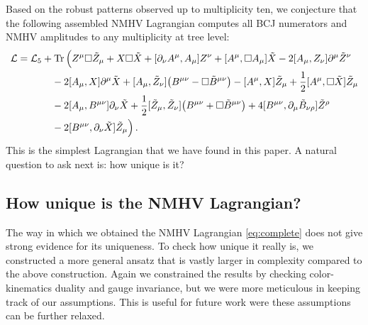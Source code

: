 \documentclass[11pt,a4paper]{article}
\newcommand{\scalarF}{\textcolor{black}{X}}
\begin{document}
 Based on the robust patterns observed up to multiplicity ten, we conjecture that the following assembled NMHV Lagrangian computes all BCJ numerators and NMHV amplitudes to any multiplicity at tree level:
\begin{align}\label{eq:complete}
\mathcal{L} = \mathcal{L}_5 &+ \text{Tr} \, \Big( Z^\mu \Box \tilde{Z}_\mu + X \Box \tilde{X}+ 
  [\partial_\nu A^\mu, A_\mu]  Z^\nu +  [A^\mu, \Box  A_\mu] \tilde{X} -2  [A_\mu, Z_\nu ]\partial^\mu \tilde{Z}^\nu  \notag \\
  & \quad -2  [A_\mu, \scalarF ]\partial^\mu \tilde{\scalarF} + [A_\mu ,\tilde{Z}_\nu] \big( B^{\mu \nu} 
-   \Box \tilde{B}^{\mu \nu} \big)  - [A^\mu, X ]\tilde{Z}_\mu + \frac{1}{2} [A^\mu, \Box \tilde{X}] \tilde{Z}_\mu \notag \\
& \quad - 2 [A_\mu, B^{\mu \nu}] \partial_\nu \tilde{X}  +  \frac{1}{2} [\tilde{Z}_{\mu} ,\tilde{Z}_{\nu}] \big(   B^{\mu \nu}
+  \Box \tilde{B}^{\mu \nu} \big)  + 4  [B^{\mu \nu} , \partial_\mu\tilde{B}_{\nu\rho} ] \tilde{Z}^{\rho} \notag \\
%
& \quad - 2 [B^{\mu \nu} ,\partial_\nu \tilde{X}] \tilde{Z}_\mu \Big) \, . 
\end{align}
This is the simplest Lagrangian that we have found in this paper. A natural question to ask next is: how unique is it? 

\subsection{How unique is the NMHV Lagrangian?}
The way in which we obtained the NMHV Lagrangian \eqref{eq:complete} does not give strong evidence for its uniqueness. To check how unique it really is, we constructed a more general ansatz that is vastly larger in complexity compared to the above construction. Again we constrained the results by checking color-kinematics duality and gauge invariance, but we were more meticulous in keeping track of our assumptions. This is useful for future work were these assumptions can be further relaxed.
\end{document}
